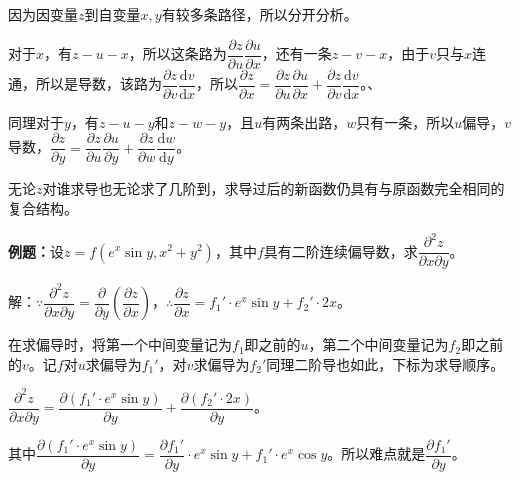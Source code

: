 \documentclass[UTF8, 12pt]{ctexart}
\begin{document}
\begin{minipage}{0.25\linewidth}
\end{minipage}
\hfill
\begin{minipage}{0.65\linewidth}
    因为因变量$z$到自变量$x,y$有较多条路径，所以分开分析。

    对于$x$，有$z-u-x$，所以这条路为$\dfrac{\partial z}{\partial u}\dfrac{\partial u}{\partial x}$，还有一条$z-v-x$，由于$v$只与$x$连通，所以是导数，该路为$\dfrac{\partial z}{\partial v}\dfrac{\textrm{d}v}{\textrm{d}x}$，所以$\dfrac{\partial z}{\partial x}=\dfrac{\partial z}{\partial u}\dfrac{\partial u}{\partial x}+\dfrac{\partial z}{\partial v}\dfrac{\textrm{d}v}{\textrm{d}x}$。、

    同理对于$y$，有$z-u-y$和$z-w-y$，且$u$有两条出路，$w$只有一条，所以$u$偏导，$v$导数，$\dfrac{\partial z}{\partial y}=\dfrac{\partial z}{\partial u}\dfrac{\partial u}{\partial y}+\dfrac{\partial z}{\partial w}\dfrac{\textrm{d}w}{\textrm{d}y}$。
\end{minipage} \medskip

无论$z$对谁求导也无论求了几阶到，求导过后的新函数仍具有与原函数完全相同的复合结构。

\textbf{例题：}设$z=f(e^x\sin y,x^2+y^2)$，其中$f$具有二阶连续偏导数，求$\dfrac{\partial^2z}{\partial x\partial y}$。

解：$\because\dfrac{\partial^2z}{\partial x\partial y}=\dfrac{\partial}{\partial y}\left(\dfrac{\partial z}{\partial x}\right)$，$\therefore\dfrac{\partial z}{\partial x}=f_1'\cdot e^x\sin y+f_2'\cdot2x$。

在求偏导时，将第一个中间变量记为$f_1$即之前的$u$，第二个中间变量记为$f_2$即之前的$v$。记$f$对$u$求偏导为$f_1'$，对$v$求偏导为$f_2'$同理二阶导也如此，下标为求导顺序。

$\dfrac{\partial^2z}{\partial x\partial y}=\dfrac{\partial(f_1'\cdot e^x\sin y)}{\partial y}+\dfrac{\partial(f_2'\cdot2x)}{\partial y}$。

其中$\dfrac{\partial(f_1'\cdot e^x\sin y)}{\partial y}=\dfrac{\partial f_1'}{\partial y}\cdot e^x\sin y+f_1'\cdot e^x\cos y$。所以难点就是$\dfrac{\partial f_1'}{\partial y}$。
\end{document}
